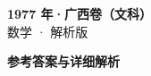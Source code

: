 \documentclass[zihao=-4, a4paper]{ctexart}
\begin{document}
\begin{center}
  {\Large\bfseries 1977 年·广西卷（文科）}\\[4pt]
  {\large 数学 · 解析版}
\end{center}
\medskip
{}

\clearpage
{}
\begin{center}{\Large\bfseries 参考答案与详细解析}\end{center}
\medskip

\end{document}
